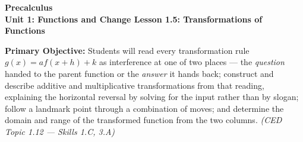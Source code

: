 \documentclass[10pt]{article}
\newcommand{\CourseName}{Precalculus}
\newcommand{\UnitNumberName}{Unit 1: Functions and Change \quad}
\newcommand{\LessonNumberName}{Lesson 1.5: Transformations of Functions}
\begin{document}
\begin{center}
    {\Large\bfseries \CourseName \\
    {\small\bfseries \UnitNumberName \LessonNumberName}}
\end{center}

\begin{tcolorbox}[colback=lilac, colframe=plum, boxrule=0.9pt, arc=2mm,
    left=2mm, right=2mm, top=1.5mm, bottom=1.5mm]
    \textbf{Primary Objective:} Students will read every transformation rule
    $g(x) = af(x+h)+k$ as interference at one of two places --- the
    \textit{question} handed to the parent function or the \textit{answer} it
    hands back; construct and describe additive and multiplicative
    transformations from that reading, explaining the horizontal reversal by
    solving for the input rather than by slogan; follow a landmark point
    through a combination of moves; and determine the domain and range of the
    transformed function from the two columns.
    \hfill\textit{\small (CED Topic 1.12 --- Skills 1.C, 3.A)}
\end{tcolorbox}
\end{document}
